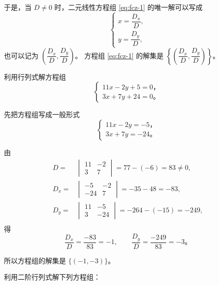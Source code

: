于是，当 $D \neq 0$ 时，二元线性方程组 \eqref{eq:fcz-1} 的唯一解可以写成
\begin{equation*}
    \begin{cases}
        x = \dfrac{D_x}{D}, \\[1.5em]
        y = \dfrac{D_y}{D},
    \end{cases} \tag{9}\label{eq:ejhls-9}
\end{equation*}
也可以记为 $\left( \dfrac{D_x}{D}, \dfrac{D_y}{D} \right)$。
方程组 \eqref{eq:fcz-1} 的解集是 $\left\{\left( \dfrac{D_x}{D}, \dfrac{D_y}{D} \right)\right\}$。


\setcounter{cntliti}{1}
\liti 利用行列式解方程组
$$\begin{cases}
    11x - 2y + 5 = 0 \text{，} \\
    3x + 7y + 24 = 0 \text{。}
\end{cases}$$

\jie 先把方程组写成一般形式
$$\begin{cases}
    11x - 2y = -5 \text{，} \\
    3x + 7y = -24 \text{。}
\end{cases}$$

由
\begin{align*}
    D ={} & \begin{vmatrix}
            11 & -2 \\
            3  & 7
        \end{vmatrix} = 77 - (-6) = 83 \neq 0, \\
    D_x ={} & \begin{vmatrix}
            -5  & -2 \\
            -24 & 7
        \end{vmatrix} = -35 - 48 = -83, \\
    D_y ={} & \begin{vmatrix}
            11 & -5 \\
            3  & -24
        \end{vmatrix} = -264 - (-15) = -249, \\
\end{align*}
得
$$ \dfrac{D_x}{D} = \dfrac{-83}{83} = -1, \qquad \dfrac{D_y}{D} = \dfrac{-249}{83} = -3 \text{。} $$

所以方程组的解集是 $\{(-1, -3)\}$。


\lianxi

利用二阶行列式解下列方程组：

\begin{xiaoxiaotis}


\end{xiaoxiaotis}



